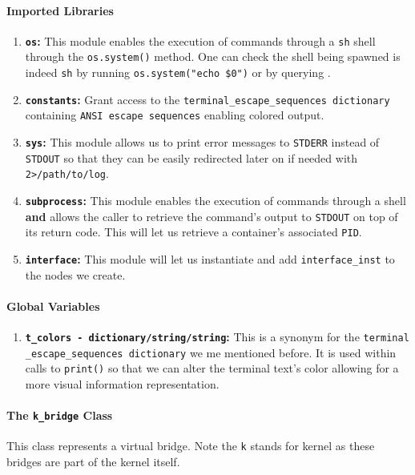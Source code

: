     \paragraph{Imported Libraries}
        \begin{enumerate}
            \item \textbf{\texttt{os}:} This module enables the execution of commands through a \texttt{sh} shell through the \texttt{os.system()} method. One can check the shell being spawned is indeed \texttt{sh} by running \texttt{\allowbreak os.system("echo \$0")} or by querying \cite{bib:man-system}.
            \item \textbf{\texttt{constants}:} Grant access to the \texttt{\allowbreak terminal\_escape\_sequences dictionary} containing \texttt{ANSI escape sequences} enabling colored output.
            \item \textbf{\texttt{sys}:} This module allows us to print error messages to \texttt{STDERR} instead of \texttt{STDOUT} so that they can be easily redirected later on if needed with \texttt{2>/path/to/log}.
            \item \textbf{\texttt{subprocess}:} This module enables the execution of commands through a shell \textbf{and} allows the caller to retrieve the command's output to \texttt{STDOUT} on top of its return code. This will let us retrieve a container's associated \texttt{PID}.
            \item \textbf{\texttt{interface}:} This module will let us instantiate and add \texttt{interface\_inst} to the nodes we create.
        \end{enumerate}

    \paragraph{Global Variables}
        \begin{enumerate}
            \item \textbf{\texttt{\allowbreak t\_colors - dictionary/string/string}:} This is a synonym for the \texttt{\allowbreak terminal \_escape\_sequences dictionary} we me mentioned before. It is used within calls to \texttt{print()} so that we can alter the terminal text's color allowing for a more visual information representation.
        \end{enumerate}

    \paragraph{The \texttt{k\_bridge} Class}
        This class represents a virtual bridge. Note the \texttt{k} stands for kernel as these bridges are part of the kernel itself.

